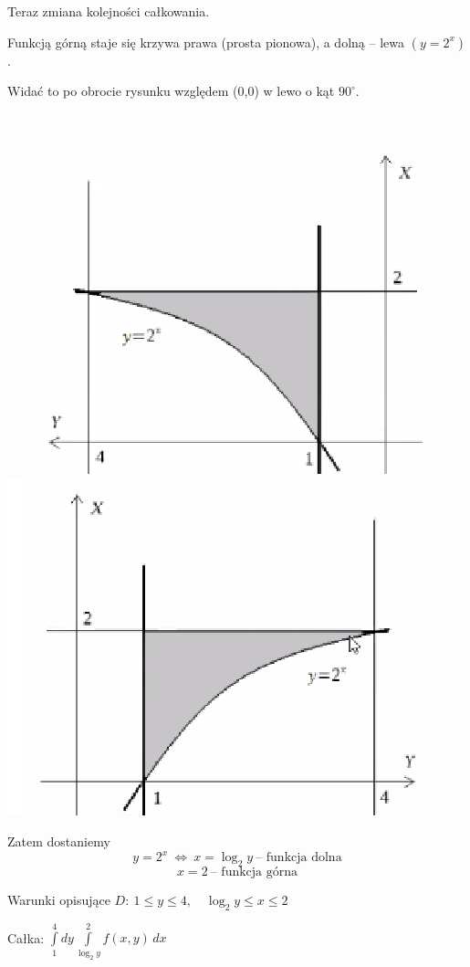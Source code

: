 \begin{przykladbig}
Teraz zmiana kolejności całkowania.

Funkcją górną staje się krzywa prawa (prosta pionowa), a dolną -- lewa $(y=2^x)$.

Widać to po obrocie rysunku względem (0,0) w lewo o kąt $90^{\circ}$.

\begin{center}
\includegraphics[scale=0.45]{img/2xzlewej.png}
\includegraphics[scale=0.45]{img/2xzprawej.png}
\end{center}

Zatem dostaniemy
\[ y = 2^x \ \Leftrightarrow \ x = \log_2 y \ \textrm{-- funkcja dolna} \]
\[ x = 2 \ \textrm{-- funkcja górna} \]

Warunki opisujące $D: \ 1 \leq y \leq 4, \quad \log_2 y \leq x \leq 2$

Całka: $ \int\limits_{1}^{4} dy \int\limits_{\log_2 y}^{2} f(x,y)\, dx $
\end{przykladbig}

